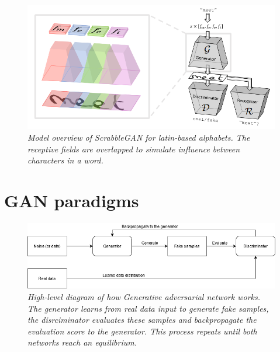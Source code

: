\documentclass[12pt]{report}
\begin{document}
\begin{figure}[h]
	\centering
	\includegraphics[scale=0.8]{scrabble-gan}
	\caption{\textit{Model overview of ScrabbleGAN \cite{scrabble-gan} for latin-based alphabets. The receptive fields are overlapped to simulate influence between characters in a word.}}
	\label{fig:scrabble-gan}
\end{figure}

\section{GAN paradigms}

\begin{figure}[h]
	\centering
	\includegraphics[scale=0.6]{gan-diagram}
	\caption{\textit{High-level diagram of how Generative adversarial network \cite{gan} works. The generator learns from real data input to generate fake samples, the disrciminator evaluates these samples and backpropagate the evaluation score to the generator. This process repeats until both networks reach an equilibrium.}}
	\label{fig:gan-diagram}
\end{figure}
\end{document}
